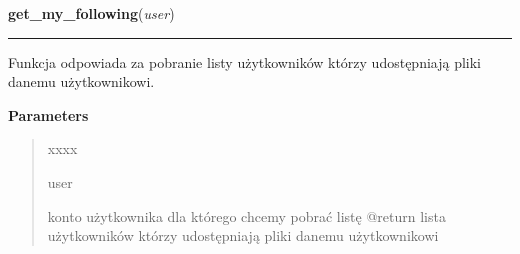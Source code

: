     \label{ass8_portal:friends:helpers:get_my_following}

    \vspace{0.5ex}

\hspace{.8\funcindent}\begin{boxedminipage}{\funcwidth}

    \raggedright \textbf{get\_my\_following}(\textit{user})

    \vspace{-1.5ex}

    \rule{\textwidth}{0.5\fboxrule}
\setlength{\parskip}{2ex}
    Funkcja odpowiada za pobranie listy użytkowników którzy udostępniają 
    pliki danemu użytkownikowi.

\setlength{\parskip}{1ex}
      \textbf{Parameters}
      \vspace{-1ex}

      \begin{quote}
        \begin{Ventry}{xxxx}

          \item[user]

          konto użytkownika dla którego chcemy pobrać listę @return lista 
          użytkowników którzy udostępniają pliki danemu użytkownikowi

        \end{Ventry}

      \end{quote}

    \end{boxedminipage}

    \label{ass8_portal:friends:helpers:get_mutual}

    \vspace{0.5ex}

